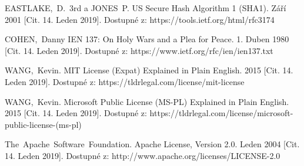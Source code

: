 \documentclass[conference]{IEEEtran}
\begin{document}
\begin{thebibliography}{1}
EASTLAKE,~D.~3rd a JONES~P. US Secure Hash Algorithm 1 (SHA1). Září 2001 [Cit. 14. Leden 2019]. Dostupné z: https://tools.ietf.org/html/rfc3174

COHEN,~Danny IEN 137: On Holy Wars and a Plea for Peace. 1. Duben 1980 [Cit. 14. Leden 2019]. Dostupné z: https://www.ietf.org/rfc/ien/ien137.txt

WANG,~Kevin. MIT License (Expat) Explained in Plain English. 2015 [Cit. 14. Leden 2019]. Dostupné z: https://tldrlegal.com/license/mit-license

WANG,~Kevin. Microsoft Public License (MS-PL) Explained in Plain English. 2015 [Cit. 14. Leden 2019]. Dostupné z: https://tldrlegal.com/license/microsoft-public-license-(ms-pl)

The~Apache~Software~Foundation. Apache License, Version 2.0. Leden 2004 [Cit. 14. Leden 2019]. Dostupné z: http://www.apache.org/licenses/LICENSE-2.0

\end{thebibliography}
\end{document}

